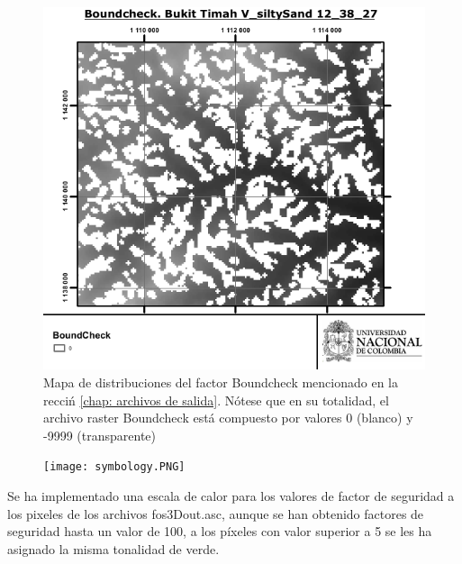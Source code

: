 \begin{figure}[H]
\centering
\includegraphics[scale=1]{img/boundcheck.pdf}
\caption{Mapa de distribuciones del factor Boundcheck mencionado en la recci\'n \ref{chap: archivos de salida}.
N\'otese que en su totalidad, el archivo raster Boundcheck est\'a compuesto por valores 0 (blanco) y -9999 (transparente) }
\label{fig:boundcheck}
\end{figure}




\begin{figure} %
    \centering
    \texttt{[image: symbology.PNG]}
\end{figure}


Se ha implementado una escala de calor para los valores de factor de seguridad a los
pixeles de los archivos fos3D\textunderscore out.asc, aunque se han obtenido factores de seguridad hasta
un valor de 100, a los p\'ixeles con valor superior a 5 se les ha asignado la misma tonalidad
de verde.
\\

